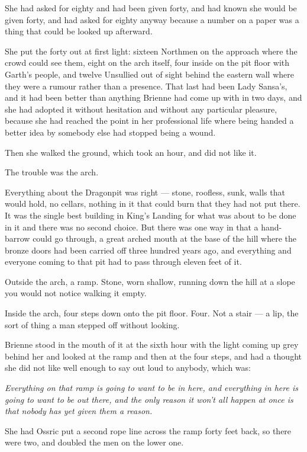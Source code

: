 She had asked for eighty and had been given forty, and had known she would be given forty, and had asked for eighty anyway because a number on a paper was a thing that could be looked up afterward.

She put the forty out at first light: sixteen Northmen on the approach where the crowd could see them, eight on the arch itself, four inside on the pit floor with Garth’s people, and twelve Unsullied out of sight behind the eastern wall where they were a rumour rather than a presence. That last had been Lady Sansa’s, and it had been better than anything Brienne had come up with in two days, and she had adopted it without hesitation and without any particular pleasure, because she had reached the point in her professional life where being handed a better idea by somebody else had stopped being a wound.

Then she walked the ground, which took an hour, and did not like it.

The trouble was the arch.

Everything about the Dragonpit was right — stone, roofless, sunk, walls that would hold, no cellars, nothing in it that could burn that they had not put there. It was the single best building in King’s Landing for what was about to be done in it and there was no second choice. But there was one way in that a hand-barrow could go through, a great arched mouth at the base of the hill where the bronze doors had been carried off three hundred years ago, and everything and everyone coming to that pit had to pass through eleven feet of it.

Outside the arch, a ramp. Stone, worn shallow, running down the hill at a slope you would not notice walking it empty.

Inside the arch, four steps down onto the pit floor. Four. Not a stair — a lip, the sort of thing a man stepped off without looking.

Brienne stood in the mouth of it at the sixth hour with the light coming up grey behind her and looked at the ramp and then at the four steps, and had a thought she did not like well enough to say out loud to anybody, which was:

\textit{Everything on that ramp is going to want to be in here, and everything in here is going to want to be out there, and the only reason it won’t all happen at once is that nobody has yet given them a reason.}

She had Ossric put a second rope line across the ramp forty feet back, so there were two, and doubled the men on the lower one.

